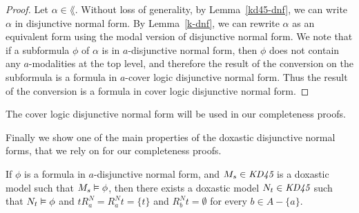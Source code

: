 \begin{proof}
Let $\alpha \in \lang$. Without loss of generality, by Lemma~\ref{kd45-dnf}, we
can write $\alpha$ in disjunctive normal form. By Lemma~\ref{k-dnf}, we can
rewrite $\alpha$ as an equivalent form using the modal version of disjunctive
normal form. We note that if a subformula $\phi$ of $\alpha$ is in
$a$-disjunctive normal form, then $\phi$ does not contain any $a$-modalities at
the top level, and therefore the result of the conversion on the subformula is
a formula in $a$-cover logic disjunctive normal form. Thus the result of the
conversion is a formula in cover logic disjunctive normal form.
\end{proof}

The cover logic disjunctive normal form will be used in our completeness proofs.

Finally we show one of the main properties of the doxastic disjunctive normal
forms, that we rely on for our completeness proofs.

\begin{lemma}\label{kd45-successors}
If $\phi$ is a formula in $a$-disjunctive normal form, and $M_s \in \textit{KD45}$ is
a doxastic model such that $M_s \vDash \phi$, then there exists a doxastic
model $N_t \in \textit{KD45}$ such that $N_t \vDash \phi$ and $tR^N_a = R^N_at =
\{t\}$ and $R^N_bt = \emptyset$ for every $b \in A - \{a\}$.
\end{lemma}

